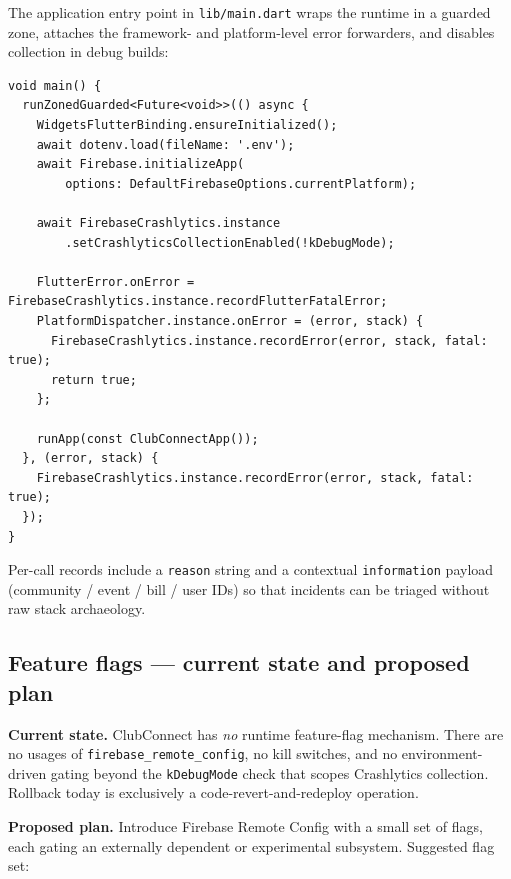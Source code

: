\documentclass[11pt,a4paper]{article}
\begin{document}
The application entry point in \texttt{lib/main.dart} wraps the runtime in
a guarded zone, attaches the framework- and platform-level error
forwarders, and disables collection in debug builds:

\begin{lstlisting}[basicstyle=\ttfamily\scriptsize]
void main() {
  runZonedGuarded<Future<void>>(() async {
    WidgetsFlutterBinding.ensureInitialized();
    await dotenv.load(fileName: '.env');
    await Firebase.initializeApp(
        options: DefaultFirebaseOptions.currentPlatform);

    await FirebaseCrashlytics.instance
        .setCrashlyticsCollectionEnabled(!kDebugMode);

    FlutterError.onError = FirebaseCrashlytics.instance.recordFlutterFatalError;
    PlatformDispatcher.instance.onError = (error, stack) {
      FirebaseCrashlytics.instance.recordError(error, stack, fatal: true);
      return true;
    };

    runApp(const ClubConnectApp());
  }, (error, stack) {
    FirebaseCrashlytics.instance.recordError(error, stack, fatal: true);
  });
}
\end{lstlisting}

Per-call records include a \texttt{reason} string and a contextual
\texttt{information} payload (community / event / bill / user IDs) so that
incidents can be triaged without raw stack archaeology.

\subsection{Feature flags --- current state and proposed plan}

\textbf{Current state.} ClubConnect has \emph{no} runtime feature-flag
mechanism. There are no usages of \texttt{firebase\_remote\_config}, no
kill switches, and no environment-driven gating beyond the
\texttt{kDebugMode} check that scopes Crashlytics collection. Rollback
today is exclusively a code-revert-and-redeploy operation.

\textbf{Proposed plan.} Introduce Firebase Remote Config with a small set
of flags, each gating an externally dependent or experimental subsystem.
Suggested flag set:
\end{document}
